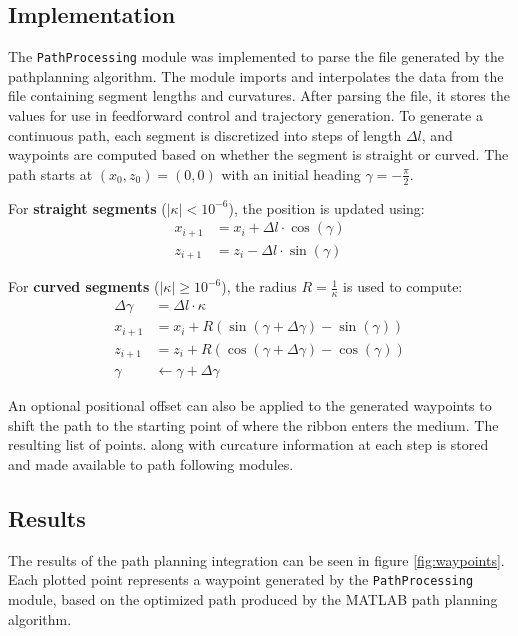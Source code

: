 \subsection{Implementation}
The \texttt{PathProcessing} module was implemented to parse the file generated by the pathplanning algorithm. The module imports and interpolates the data from the file containing segment lengths and curvatures. After parsing the file, it stores the values for use in feedforward control and trajectory generation.
\newline \newline
To generate a continuous path, each segment is discretized into steps of length \( \Delta l \), and waypoints are computed based on whether the segment is straight or curved. The path starts at \( (x_0, z_0) = (0, 0) \) with an initial heading \( \gamma = -\frac{\pi}{2} \).

For \textbf{straight segments} (\( |\kappa| < 10^{-6} \)), the position is updated using:
\begin{align}
x_{i+1} &= x_i + \Delta l \cdot \cos(\gamma) \\
z_{i+1} &= z_i - \Delta l \cdot \sin(\gamma)
\end{align}

For \textbf{curved segments} (\( |\kappa| \geq 10^{-6} \)), the radius \( R = \frac{1}{\kappa} \) is used to compute:
\begin{align}
\Delta \gamma &= \Delta l \cdot \kappa \\
x_{i+1} &= x_i + R \left( \sin(\gamma + \Delta \gamma) - \sin(\gamma) \right) \\
z_{i+1} &= z_i + R \left( \cos(\gamma + \Delta \gamma) - \cos(\gamma) \right) \\
\gamma &\leftarrow \gamma + \Delta \gamma
\end{align}

An optional positional offset can also be applied to the generated waypoints to shift the path to the starting point of where the ribbon enters the medium. The resulting list of points. along with curcature information at each step is stored and made available to path following modules. 

\subsection{Results}
The results of the path planning integration can be seen in figure \ref{fig:waypoints}. Each plotted point represents a waypoint generated by the \texttt{PathProcessing} module, based on the optimized path produced by the MATLAB path planning algorithm.

